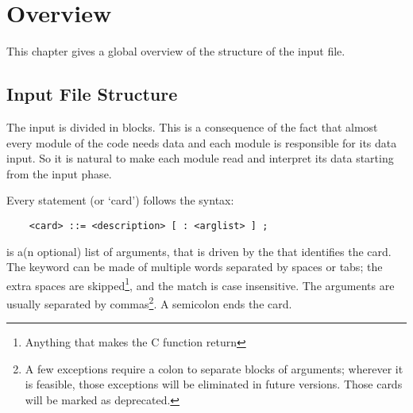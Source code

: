 %
%
%
%
%
% 
%
%

\chapter{Overview}\label{sec:OVERVIEW}
This chapter gives a global overview of the structure of the input file.


\section{Input File Structure}
The input is divided in blocks.
This is a consequence of the fact that almost every module of the code 
needs data and each module is responsible for its data input. 
So it is natural to make each module read and interpret its data starting 
from the input phase.

Every statement (or `card') follows the syntax:
\begin{verbatim}
    <card> ::= <description> [ : <arglist> ] ;
\end{verbatim}
 is a(n optional) list of arguments, that is driven by the 
 that identifies the card. 
The keyword can be made of multiple words separated by spaces or tabs; 
the extra spaces are skipped\footnote{
	Anything that makes the C function  
	return 
}, and the match is case insensitive. 
The arguments are usually separated by commas\footnote{
	A few exceptions require a colon to separate blocks of arguments;
	wherever it is feasible, those exceptions will be eliminated 
	in future versions.
	Those cards will be marked as deprecated.
}.
A semicolon ends the card. 


